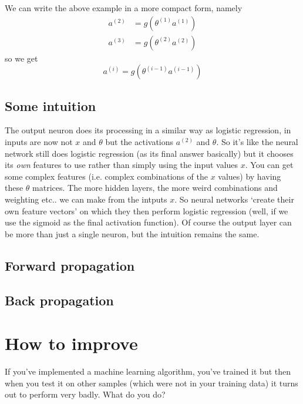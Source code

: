 \documentclass[a4paper, 10pt,hidelinks]{article}
\newcommand{\ind}[1]{^{(#1)}}
\begin{document}
We can write the above example in a more compact form, namely 
\begin{align}
a\ind{2} &= g(\theta\ind{1} a\ind{1}) \nonumber \\
a\ind{3} &= g(\theta\ind{2} a\ind{2})
\end{align}
so we get
\begin{equation}
a\ind{i} = g(\theta\ind{i-1} a\ind{i - 1})
\end{equation}


\subsection{Some intuition}
The output neuron does its processing in a similar way as logistic regression, in inputs are now not $x$ and $\theta$ but the activations $a\ind{2}$ and $\theta$. So it's like the neural network still does logistic regression (as its final answer basically) but it chooses its \emph{own} features to use rather than simply using the input values $x$. You can get some complex features (i.e. complex combinations of the $x$ values) by having these $\theta$ matrices. The more hidden layers, the more weird combinations and weighting etc.. we can make from the intputs $x$. So neural networks `create their own feature vectors' on which they then perform logistic regression (well, if we use the sigmoid as the final activation function). Of course the output layer can be more than just a single neuron, but the intuition remains the same. 


\subsection{Forward propagation}



\subsection{Back propagation}


\section{How to improve}
If you've implemented a machine learning algorithm, you've trained it but then when you test it on other samples (which were not in your training data) it turns out to perform very badly. What do you do?
\end{document}
